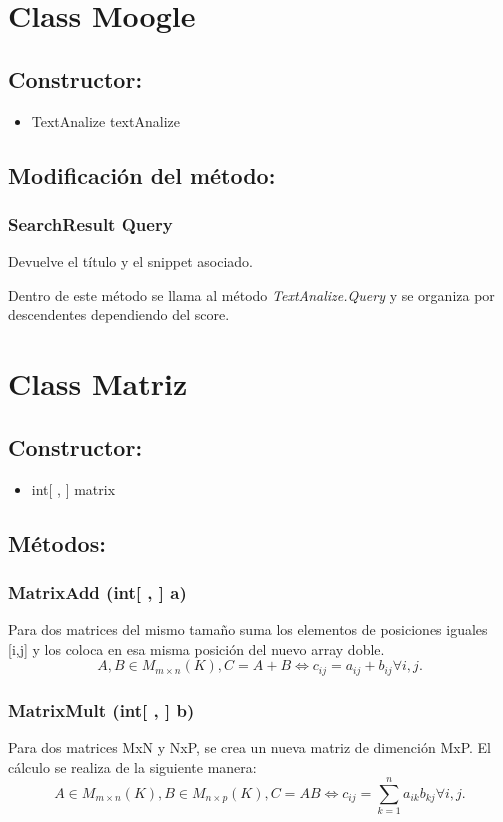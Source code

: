 \documentclass[a4paper,12pt,]{article}
\begin{document}
\section*{Class Moogle}

\subsection*{Constructor:}
\begin{itemize}
    \item TextAnalize textAnalize
\end{itemize}

\subsection*{Modificación del método:}
\subsubsection*{SearchResult Query}
Devuelve el título y el snippet asociado.

Dentro de este método se llama al método \textit{TextAnalize.Query} y se organiza por descendentes dependiendo del 
score.


\section*{Class Matriz}

\subsection*{Constructor:}
\begin{itemize}
    \item int[ , ] matrix
\end{itemize}

\subsection*{Métodos:}
\subsubsection*{MatrixAdd (int[ , ] a)}
Para dos matrices del mismo tamaño suma los elementos de posiciones iguales [i,j] y los coloca en esa misma posición 
del nuevo array doble. 
\[A,B \in M_{m\times n}(K),  C = A + B  \Leftrightarrow  c_{ij} = a_{ij} + b_{ij}  \forall i,j. \] 

\subsubsection*{MatrixMult (int[ , ] b)}
Para dos matrices MxN y NxP, se crea un nueva matriz de dimención MxP. El cálculo se realiza de la siguiente manera:
\[ A \in M_{m\times n}(K), B \in M_{n\times p}(K), C = AB \Leftrightarrow  c_{ij} = \sum_{k = 1}^{n} a_{ik}b_{kj} \forall i,j. \]
\end{document}
